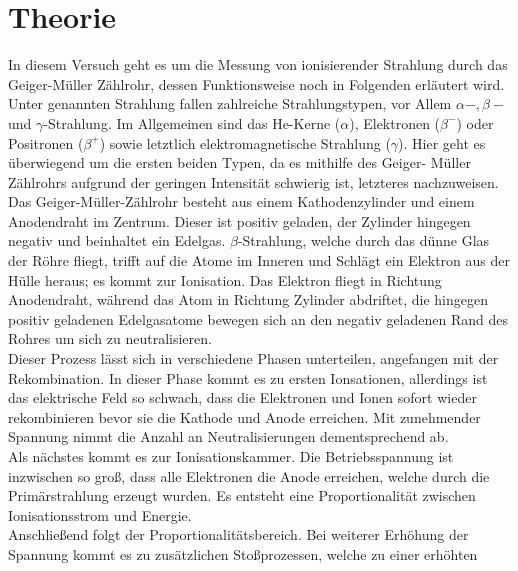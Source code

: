\section{Theorie}
\label{sec:Theorie}

In diesem Versuch geht es um die Messung von ionisierender Strahlung durch 
das Geiger-Müller Zählrohr, dessen Funktionsweise noch in Folgenden
erläutert wird. Unter genannten Strahlung fallen zahlreiche
Strahlungstypen, vor Allem $\alpha-, \beta-$ und $\gamma$-Strahlung. Im 
Allgemeinen sind das He-Kerne ($\alpha$), Elektronen ($\beta^-$) oder Positronen
($\beta^+$) sowie letztlich elektromagnetische Strahlung ($\gamma$). Hier geht
es überwiegend um die ersten beiden Typen, da es mithilfe des Geiger-
Müller Zählrohrs aufgrund der geringen Intensität schwierig ist, letzteres
nachzuweisen.
\vspace{0.5em}
\\
\noindent Das Geiger-Müller-Zählrohr besteht aus einem Kathodenzylinder und 
einem Anodendraht im Zentrum. Dieser ist positiv geladen, der Zylinder hingegen 
negativ und beinhaltet ein Edelgas. $\beta$-Strahlung, welche durch das dünne 
Glas der Röhre fliegt, trifft auf die Atome im Inneren und Schlägt ein Elektron 
aus der Hülle heraus; es kommt zur Ionisation. Das Elektron fliegt in Richtung 
Anodendraht, während das Atom in Richtung Zylinder abdriftet, die hingegen 
positiv geladenen Edelgasatome bewegen sich an den negativ geladenen Rand des 
Rohres um sich zu neutralisieren.
\vspace{0.5em}
\\
\noindent Dieser Prozess lässt sich in verschiedene 
Phasen unterteilen, angefangen mit der Rekombination. In dieser Phase kommt es 
zu ersten Ionsationen, allerdings ist das elektrische Feld so schwach, dass 
die Elektronen und Ionen sofort wieder rekombinieren bevor sie die Kathode und 
Anode erreichen. Mit zunehmender Spannung nimmt die Anzahl an Neutralisierungen 
dementsprechend ab.
\vspace{0.5em}
\\
\noindent Als nächstes kommt es zur Ionisationskammer. Die Betriebsspannung ist 
inzwischen so groß, dass alle Elektronen die Anode erreichen, welche durch
die Primärstrahlung erzeugt wurden. Es entsteht eine Proportionalität zwischen 
Ionisationsstrom und Energie.
\vspace{0.5em}
\\
\noindent Anschließend folgt der Proportionalitätsbereich. Bei weiterer Erhöhung 
der Spannung kommt es zu zusätzlichen Stoßprozessen, welche zu einer erhöhten 
